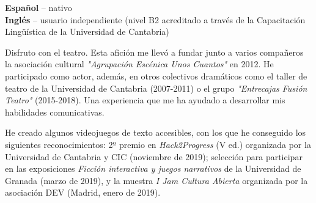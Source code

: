 \documentclass[9pt]{developercv} %
\begin{document}
\begin{minipage}[t]{0.3\textwidth}
	\vspace{-\baselineskip} %

	
	\textbf{Español} -- nativo\\
	\textbf{Inglés} -- usuario independiente (nivel B2 acreditado a través de la Capacitación Lingüística de la Universidad de Cantabria)\\
\end{minipage}
\hfill
\begin{minipage}[t]{0.3\textwidth}
	\vspace{-\baselineskip} %
	

	Disfruto con el teatro. Esta afición me llevó a fundar junto a varios compañeros la asociación cultural \emph{"Agrupación Escénica Unos Cuantos"} en 2012. He participado como actor, además, en otros colectivos dramáticos como el taller de teatro de la Universidad de Cantabria (2007-2011) o el grupo \emph{"Entrecajas Fusión Teatro"} (2015-2018). Una experiencia que me ha ayudado a desarrollar mis habilidades comunicativas.
\end{minipage}
\hfill
\begin{minipage}[t]{0.3\textwidth}
	\vspace{-\baselineskip} %
	

	He creado algunos videojuegos de texto accesibles, con los que he conseguido los siguientes reconocimientos: 2º premio en \emph{Hack2Progress} (V ed.) organizada por la Universidad de Cantabria y CIC (noviembre de 2019); selección para participar en las exposiciones \emph{Ficción interactiva y juegos narrativos} de la Universidad de Granada (marzo de 2019), y la muestra \emph{I Jam Cultura Abierta} organizada por la asociación DEV (Madrid, enero de 2019).
\end{minipage}

\end{document}

